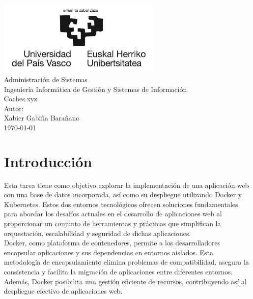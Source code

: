 \documentclass{report}
\begin{document}
    \begin{titlepage}
        \centering
        \includegraphics[width=0.6\textwidth]{./img/logo.jpg}\\
        \vspace{1cm}
        \LARGE Administración de Sistemas\\
        \vspace{0.5cm}
        \Large Ingeniería Informática de Gestión y Sistemas de Información\\
        \vspace{3cm}
        \Huge Coches.xyz\\
        \vspace{2.5cm}
        \Large Autor:\\
        \vspace{0.2cm}
        \large Xabier Gabiña Barañano\\
        \vfill
        \today
    \end{titlepage}

    \tableofcontents
    \chapter{Introducción}
        Esta tarea tiene como objetivo explorar la implementación de una aplicación web con una base de datos incorporada, así como su despliegue utilizando Docker y Kubernetes. Estos dos entornos tecnológicos ofrecen soluciones fundamentales para abordar los desafíos actuales en el desarrollo de aplicaciones web al proporcionar un conjunto de herramientas y prácticas que simplifican la orquestación, escalabilidad y seguridad de dichas aplicaciones.\\

        Docker, como plataforma de contenedores, permite a los desarrolladores encapsular aplicaciones y sus dependencias en entornos aislados. Esta metodología de encapsulamiento elimina problemas de compatibilidad, asegura la consistencia y facilita la migración de aplicaciones entre diferentes entornos. Además, Docker posibilita una gestión eficiente de recursos, contribuyendo así al despliegue efectivo de aplicaciones web.\\
        
\end{document}
